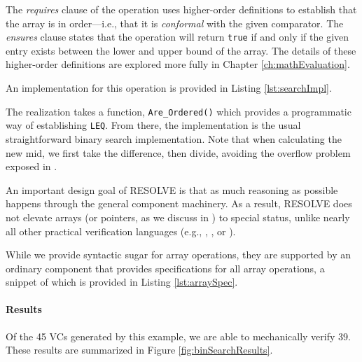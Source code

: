 The \emph{requires} clause of the operation uses higher-order definitions to establish that the array is in order---i.e., that it is \emph{conformal} with the given comparator.  The \emph{ensures} clause states that the operation will return \texttt{true} if and only if the given entry exists between the lower and upper bound of the array.  The details of these higher-order definitions are explored more fully in Chapter \ref{ch:mathEvaluation}.

An implementation for this operation is provided in Listing \ref{lst:searchImpl}.



The realization takes a function, \texttt{Are\_Ordered()} which provides a programmatic way of establishing \texttt{LEQ}.  From there, the implementation is the usual straightforward binary search implementation.  Note that when calculating the new mid, we first take the difference, then divide, avoiding the overflow problem exposed in \cite{blochBinarySearch}.

An important design goal of RESOLVE is that as much reasoning as possible happens through the general component machinery.  As a result, RESOLVE does not elevate arrays (or pointers, as we discuss in \cite{kulczyckiPointers}) to special status, unlike nearly all other practical verification languages (e.g., \cite{DafnyOverview}, \cite{cok:esc}, or \cite{kuncakJahobOverview}).

\FloatBarrier

While we provide syntactic sugar for array operations, they are supported by an ordinary component that provides specifications for all array operations, a snippet of which is provided in Listing \ref{lst:arraySpec}.



\paragraph{Results} Of the 45 VCs generated by this example, we are able to mechanically verify 39.  These results are summarized in Figure \ref{fig:binSearchResults}.

